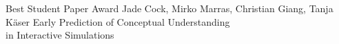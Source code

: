 \documentclass[a4paper,landscape]{article} %
\begin{document}
\diploma
    {Best Student Paper Award}
    {Jade Cock, Mirko Marras, Christian Giang, Tanja Käser}
    {Early Prediction of Conceptual Understanding\\ in Interactive Simulations}
\hfill
\end{document}
